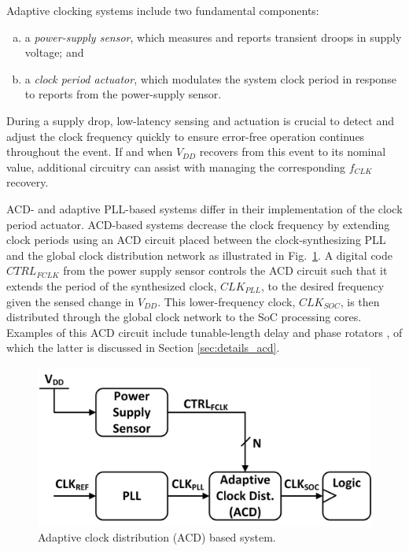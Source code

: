 \documentclass[twoside,9pt,journal,letterpage]{IEEEtran}
\begin{document}
Adaptive clocking systems include two fundamental components:

\begin{enumerate}[(a)]
\item a \textit{power-supply sensor}, which measures and
reports transient droops in supply voltage; and
\item a \textit{clock period actuator}, which modulates the
system clock period in response to reports from
the power-supply sensor.
\end{enumerate}

During a supply drop, low-latency sensing and actuation is crucial to detect and adjust the clock frequency quickly to ensure error-free operation continues throughout the event. If and when $V_{DD}$ recovers from this event to its nominal value, additional circuitry can assist with managing the corresponding $f_{CLK}$ recovery.

ACD- and adaptive PLL-based systems differ in their implementation of the clock period actuator. ACD-based systems decrease the clock frequency by extending clock periods using an ACD circuit placed between the clock-synthesizing PLL and the global clock distribution network as illustrated in Fig.\ \ref{fig:overview_acd}. A digital code $CTRL_{FCLK}$ from the power supply sensor controls the ACD circuit such that it extends the period of the synthesized clock, $CLK_{PLL}$, to the desired frequency given the sensed change in $V_{DD}$. This lower-frequency clock, $CLK_{SOC}$, is then distributed through the global clock network to the SoC processing cores. Examples of this ACD circuit include tunable-length delay \cite{bowman2016} and phase rotators \cite{wilcox2015}, of which the latter is discussed in Section \ref{sec:details_acd}.

\begin{figure}[h]
	\centering
	\includegraphics[width=0.7\columnwidth]{fig_overview_acd}
	\caption{Adaptive clock distribution (ACD) based system.}
	\label{fig:overview_acd}
\end{figure}
\end{document}

